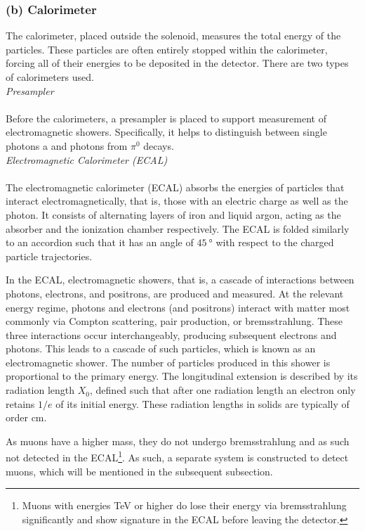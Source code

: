 \documentclass[a4paper]{report}
\numberwithin{equation}{section}
\begin{document}
\subsubsection{(b) Calorimeter}

The calorimeter, placed outside the solenoid, measures the total energy of the particles. These particles are often entirely stopped 
within the calorimeter, forcing all of their energies to be deposited in the detector. There are two types of calorimeters used. \\

\noindent \textit{Presampler} \\ \\
Before the calorimeters, a presampler is placed to support measurement of electromagnetic showers. Specifically, it helps to distinguish between single photons a
and photons from $\pi^0$ decays. \\ 

\noindent \textit{Electromagnetic Calorimeter (ECAL)}\\ \\
The electromagnetic calorimeter (ECAL) absorbs the energies of particles that interact electromagnetically, that is, those with an electric charge as well as the photon. 
It consists of alternating layers of iron and liquid argon, acting as the absorber and the ionization chamber respectively. The ECAL is folded similarly to 
an accordion such that it has an angle of $\SI{45}{\degree}$ with respect to the charged particle trajectories.  \par 

In the ECAL, electromagnetic showers, that is, a cascade of interactions between photons, electrons, and positrons, are produced and measured. At the relevant energy 
regime, photons and electrons (and positrons) interact with matter most commonly via Compton scattering, pair production, or bremsstrahlung. 
These three interactions occur interchangeably, producing subsequent electrons and photons. This leads to a cascade of such particles, which is known as an 
electromagnetic shower. The number of particles produced in this shower is proportional to the primary energy. 
The longitudinal extension is described by its radiation length $X_0$, defined such that after one radiation length an electron only retains 
$1 / e$ of its initial energy. These radiation lengths in solids are typically of order cm. \par 

As muons have a higher mass, they do not undergo bremsstrahlung and as such not detected in the ECAL\footnote{Muons with energies TeV or higher do lose their energy via 
bremsstrahlung significantly and show signature in the ECAL before leaving the detector.}. As such, a separate system is constructed to detect muons, which will be mentioned 
in the subsequent subsection. \\
\end{document}
